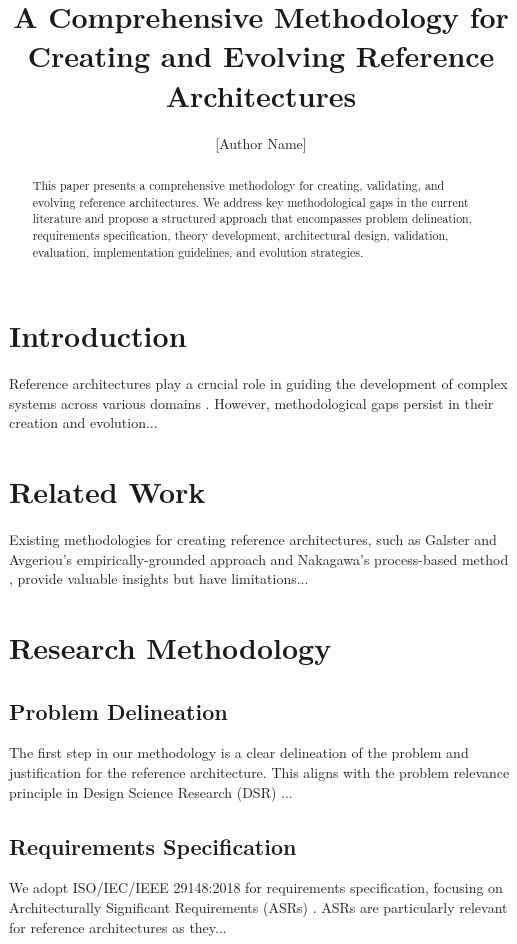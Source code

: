 \documentclass[12pt,a4paper]{article}
\title{A Comprehensive Methodology for Creating and Evolving Reference Architectures}
\author{[Author Name]}
\date{}
\begin{document}
\maketitle

\begin{abstract}
This paper presents a comprehensive methodology for creating, validating, and evolving reference architectures. We address key methodological gaps in the current literature and propose a structured approach that encompasses problem delineation, requirements specification, theory development, architectural design, validation, evaluation, implementation guidelines, and evolution strategies.
\end{abstract}

\section{Introduction}
\label{sec:introduction}
Reference architectures play a crucial role in guiding the development of complex systems across various domains \citep{Angelov2012}. However, methodological gaps persist in their creation and evolution...

\section{Related Work}
\label{sec:related-work}
Existing methodologies for creating reference architectures, such as Galster and Avgeriou's empirically-grounded approach \citep{Galster2011} and Nakagawa's process-based method \citep{Nakagawa2014}, provide valuable insights but have limitations...

\section{Research Methodology}
\label{sec:methodology}

\subsection{Problem Delineation}
\label{subsec:problem}
The first step in our methodology is a clear delineation of the problem and justification for the reference architecture. This aligns with the problem relevance principle in Design Science Research (DSR) \citep{Hevner2004}...

\subsection{Requirements Specification}
\label{subsec:requirements}
We adopt ISO/IEC/IEEE 29148:2018 \citep{ISO29148} for requirements specification, focusing on Architecturally Significant Requirements (ASRs) \citep{Chen2013}. ASRs are particularly relevant for reference architectures as they...
\end{document}
